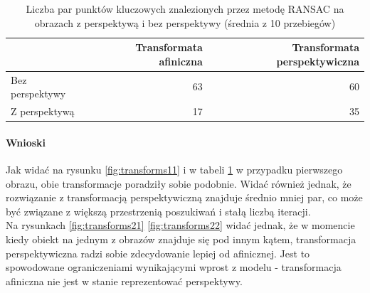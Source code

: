 \documentclass{article}
\begin{document}
	\begin{table}[H]
		\caption{Liczba par punktów kluczowych znalezionych przez metodę RANSAC na obrazach z perspektywą i bez perspektywy (średnia z 10 przebiegów)}
		\label{tab:transforms}
		\begin{tabular}{|l|r|r|}
			\hline
			& \textbf{Transformata afiniczna} & \textbf{Transformata perspektywiczna} \\ \hline
			Bez perspektywy & 63                     & 60                           \\ \hline
			Z perspektywą   & 17                     & 35                           \\ \hline
		\end{tabular}
	\end{table}

	\paragraph{Wnioski}
	Jak widać na rysunku \ref{fig:transforms11} i w tabeli \ref{tab:transforms} w przypadku pierwszego obrazu, obie transformacje poradziły sobie podobnie. Widać również jednak, że rozwiązanie z transformacją perspektywiczną znajduje średnio mniej par, co może być związane z większą przestrzenią poszukiwań i stałą liczbą iteracji.\\
	Na rysunkach \ref{fig:transforms21} \ref{fig:transforms22} widać jednak, że w momencie kiedy obiekt na jednym z obrazów znajduje się pod innym kątem, transformacja perspektywiczna radzi sobie zdecydowanie lepiej od afinicznej. Jest to spowodowane ograniczeniami wynikającymi wprost z modelu - transformacja afiniczna nie jest w stanie reprezentować perspektywy.
	
\end{document}
